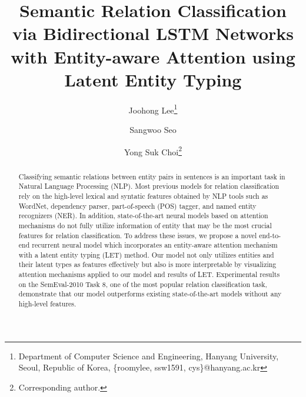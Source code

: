 \documentclass[twoside,leqno,twocolumn]{article}
\begin{document}
\title{\Large Semantic Relation Classification via Bidirectional LSTM Networks with Entity-aware Attention using Latent Entity Typing }
\author{Joohong Lee\thanks{Department of Computer Science and Engineering, Hanyang University, Seoul, Republic of Korea, \{roomylee, ssw1591, cys\}@hanyang.ac.kr} \\
\and
Sangwoo Seo\footnotemark[1] \\
\and
Yong Suk Choi\footnotemark[1] \thanks{Corresponding author.}}
\date{}

\maketitle

















\begin{abstract} \small\baselineskip=9pt 
Classifying semantic relations between entity pairs in sentences is an important task in Natural Language Processing (NLP).
Most previous models for relation classification rely on the high-level lexical and syntatic features obtained by NLP tools such as WordNet, dependency parser, part-of-speech (POS) tagger, and named entity recognizers (NER).
In addition, state-of-the-art neural models based on attention mechanisms do not fully utilize information of entity that may be the most crucial features for relation classification.
To address these issues, we propose a novel end-to-end recurrent neural model which incorporates an entity-aware attention mechanism with a latent entity typing (LET) method.
Our model not only utilizes entities and their latent types as features effectively but also is more interpretable by visualizing attention mechanisms applied to our model and results of LET. 
Experimental results on the SemEval-2010 Task 8, one of the most popular relation classification task, demonstrate that our model outperforms existing state-of-the-art models without any high-level features.
\end{abstract}
\end{document}
